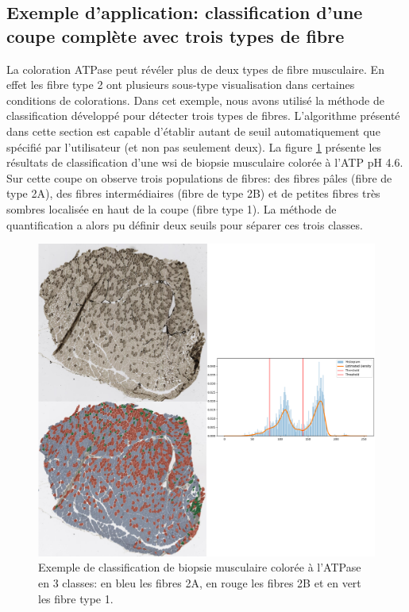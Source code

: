 \subsection{Exemple d'application: classification d'une coupe complète avec trois types de fibre}
La coloration ATPase peut révéler plus de deux types de fibre musculaire. En effet les fibre type 2 ont plusieurs sous-type visualisation dans certaines conditions de colorations. Dans cet exemple, nous avons utilisé la méthode de classification développé pour détecter trois types de fibres. L'algorithme présenté dans cette section est capable d'établir autant de seuil automatiquement que spécifié par l'utilisateur (et non pas seulement deux). La figure \ref{fig:atp_paint_wsi} présente les résultats de classification d'une \gls{wsi} de biopsie musculaire colorée à l'ATP pH 4.6. Sur cette coupe on observe trois populations de fibres: des fibres pâles (fibre de type 2A), des fibres intermédiaires (fibre de type 2B) et de petites fibres très sombres localisée en haut de la coupe (fibre type 1). La méthode de quantification a alors pu définir deux seuils pour séparer ces trois classes. 
\begin{figure}[htbp]
 \centering
 \includegraphics[width=1\textwidth]{figures/atp_wsi.png}
 \caption[Exemple de classification de biopsie musculaire colorée à l'ATPase]{Exemple de classification de biopsie musculaire colorée à l'ATPase en 3 classes: en bleu les fibres 2A, en rouge les fibres 2B et en vert les fibre type 1.}
 \label{fig:atp_paint_wsi}
\end{figure}

